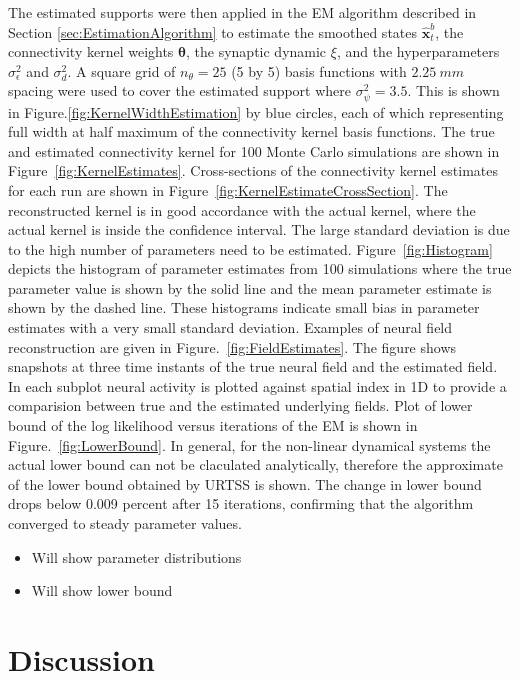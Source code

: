 \documentclass[]{article}
\begin{document}
The estimated supports were then applied in the EM algorithm described in Section \ref{sec:EstimationAlgorithm} to estimate the smoothed states $\hat{\mathbf x}_t^b$, the connectivity kernel weights $\boldsymbol\theta$, the synaptic dynamic $\xi$, and the hyperparameters $\sigma_{\epsilon}^2$ and $\sigma^2_d$. A  square grid of $n_{\theta}=25$ (5 by 5) basis functions with $2.25~mm$ spacing were used to cover the estimated support where $\sigma_{\psi}^2=3.5$. This is shown in Figure.\ref{fig:KernelWidthEstimation} by blue circles, each of which representing full width at half maximum of the connectivity kernel basis functions. The true and estimated connectivity kernel for 100 Monte Carlo simulations are shown in Figure~\ref{fig:KernelEstimates}. Cross-sections of the connectivity kernel estimates for each run are shown in Figure~\ref{fig:KernelEstimateCrossSection}. The reconstructed kernel is in good accordance with the actual kernel, where the actual kernel is inside the confidence interval. The large standard deviation is due to the high number of parameters need to be estimated. Figure~\ref{fig:Histogram} depicts the histogram of parameter estimates from 100 simulations where the true parameter value is shown by the solid line and the mean parameter estimate is shown by the dashed line. These histograms indicate small bias in parameter estimates with a very small standard deviation. Examples of neural field reconstruction are given in Figure.~\ref{fig:FieldEstimates}.  The figure shows snapshots at three time instants of the true neural field and the estimated field. In each subplot neural activity is plotted against spatial index in 1D to provide a comparision between true and the estimated underlying fields. Plot of lower bound of the log likelihood versus iterations of the EM is shown in Figure.~\ref{fig:LowerBound}. In general, for the non-linear dynamical systems the actual lower bound can not be claculated analytically, therefore the approximate of the lower bound obtained by URTSS is shown. The change in lower bound drops below 0.009 percent after 15 iterations, confirming
that the algorithm converged to steady parameter values.


 
\begin{itemize}
	\item Will show parameter distributions
	\item Will show lower bound
      \end{itemize}


\section{Discussion}
\end{document}

